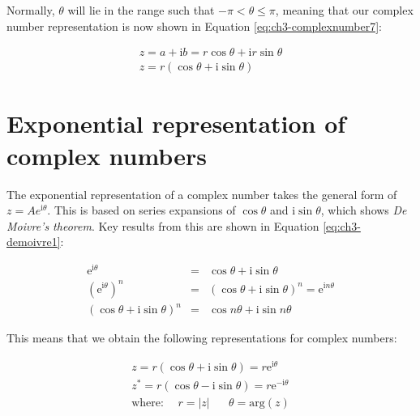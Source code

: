 \documentclass[
]{book}
\begin{document}
Normally, \(\theta\) will lie in the range such that \(-\pi < \theta \leq \pi\), meaning that our complex number representation is now shown in Equation \eqref{eq:ch3-complexnumber7}:

\begin{equation}
\begin{array}{c}
z = a + \mathrm{i}b = r \cos \theta + \mathrm{i} r \sin \theta \\
z = r \left( \cos \theta + \mathrm{i} \sin \theta \right)
\end{array}
\label{eq:ch3-complexnumber7}
\end{equation}

\hypertarget{sec:ch3-exponentialrepresentationcomplex}{%
\section{Exponential representation of complex numbers}\label{sec:ch3-exponentialrepresentationcomplex}}

The exponential representation of a complex number takes the general form of \(z = Ae^{\mathrm{i}\theta}\). This is based on series expansions of \(\cos \theta\) and \(\mathrm{i}\sin \theta\), which shows \emph{De Moivre's theorem}. Key results from this are shown in Equation \eqref{eq:ch3-demoivre1}:

\begin{equation}
\begin{array}{rcl}
\mathrm{e}^{\mathrm{i}\theta} &= &\cos \theta + \mathrm{i}\sin \theta\\
\left( \mathrm{e}^{\mathrm{i}\theta} \right)^n &=& \left( \cos \theta + \mathrm{i}\sin \theta \right)^n = \mathrm{e}^{\mathrm{i}n\theta} \\
\left( \cos \theta + \mathrm{i}\sin \theta \right)^n &=&  \cos n\theta + \mathrm{i}\sin n \theta
\end{array}
\label{eq:ch3-demoivre1}
\end{equation}

This means that we obtain the following representations for complex numbers:

\begin{equation}
\begin{array}{c}
z = r \left( \cos \theta + \mathrm{i}\sin \theta \right) = r\mathrm{e}^{\mathrm{i}\theta}\\
z^* = r \left( \cos \theta - \mathrm{i}\sin \theta \right) = r\mathrm{e}^{-\mathrm{i}\theta}\\
\textrm{where:} \hspace{15pt} r = |z| \hspace{20pt} \theta = \textrm{arg}(z)
\end{array}
\end{equation}
\end{document}
